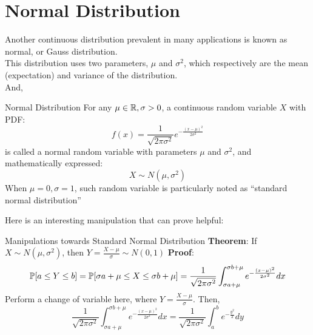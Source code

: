 \section{Normal Distribution}
Another continuous distribution prevalent in many applications is known as normal, or Gauss distribution. \\
This distribution uses two parameters, $\mu$ and $\sigma^2$, which respectively are the mean (expectation) and variance of the distribution. \\
And,
\begin{ln-define}{Normal Distribution}{}
    For any $\mu \in \R, \sigma > 0$, a continuous random variable $X$ with PDF:
    \[
        f(x) = \frac{1}{\sqrt{2 \pi \sigma^2}} e^{-\frac{{(x - \mu)}^2}{2\sigma^2}}
    \]
    is called a normal random variable with parameters $\mu$ and $\sigma^2$, and mathematically expressed:
    \[
        X \sim N(\mu, \sigma^2)
    \]
    When $\mu = 0, \sigma = 1$, such random variable is particularly noted as ``standard normal distribution''
\end{ln-define}
Here is an interesting manipulation that can prove helpful:
\begin{ln-theorem}{Manipulations towards Standard Normal Distribution}{}
    \textbf{Theorem}: If $X \sim N(\mu, \sigma^2)$, then $Y = \frac{X - \mu}{\sigma} \sim N(0, 1)$
    \tcblower
    \textbf{Proof}: \\
    \[
        \P[a \leq Y \leq b] = \P[\sigma a + \mu \leq X \leq \sigma b + \mu] = \frac{1}{\sqrt{2\pi\sigma^2}} \int_{\sigma a + \mu}^{\sigma b + \mu} e^{-\frac{{(x - \mu)}^2}{2\sigma^2}} dx
    \]
    Perform a change of variable here, where $Y = \frac{X - \mu}{\sigma}$. Then,
    \[
        \frac{1}{\sqrt{2\pi\sigma^2}} \int_{\sigma a + \mu}^{\sigma b + \mu} e^{-\frac{{(x - \mu)}^2}{2\sigma^2}} dx = \frac{1}{\sqrt{2\pi\sigma^2}} \int_a^b e^{-\frac{y^2}{2}} dy
    \]
\end{ln-theorem}

